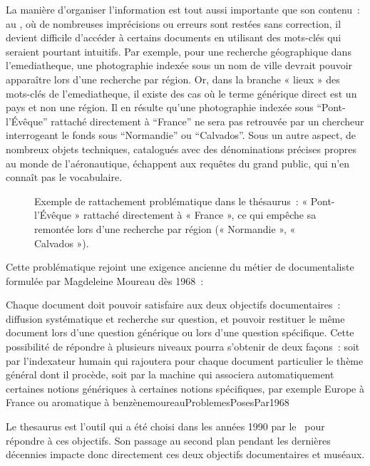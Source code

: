 La manière d’organiser l’information est tout aussi importante que son contenu~: au \mae, où de nombreuses imprécisions ou erreurs sont restées sans correction, il devient difficile d’accéder à certains documents en utilisant des mots-clés qui seraient pourtant intuitifs. Par exemple, pour une recherche géographique dans l’\gls{emediatheque}, une photographie indexée sous un nom de ville devrait pouvoir apparaître lors d’une recherche par région. Or, dans la branche « lieux » des mots-clés de l’\gls{emediatheque}, il existe des cas où le terme générique direct est un pays et non une région. Il en résulte qu’une photographie indexée sous \enquote{Pont-l’Évêque} rattaché directement à  \enquote{France} ne sera pas retrouvée par un chercheur interrogeant le fonds sous \enquote{Normandie} ou \enquote{Calvados}. Sous un autre aspect, de nombreux objets techniques, catalogués avec des dénominations précises propres au monde de l’aéronautique, échappent aux requêtes du grand public, qui n’en connaît pas le vocabulaire.

\begin{figure}[htbp]
	
	\caption{Exemple de rattachement problématique dans le thésaurus~: « Pont-l’Évêque » rattaché directement à « France », ce qui empêche sa remontée lors d'une recherche par région (« Normandie », « Calvados »).}
	\label{fig:thesaurus_geo_pb}
\end{figure}


Cette problématique rejoint une exigence ancienne du métier de documentaliste formulée par Magdeleine Moureau dès 1968~:

\begin{myquote}
	{Chaque document doit pouvoir satisfaire aux deux objectifs documentaires~: diffusion systématique et recherche sur question, et pouvoir restituer le même document lors d’une question générique ou lors d’une question spécifique. Cette possibilité de répondre à plusieurs niveaux pourra s’obtenir de deux façons~: soit par l’indexateur humain qui rajoutera pour chaque document particulier le thème général dont il procède, soit par la machine qui associera automatiquement certaines notions génériques à certaines notions spécifiques, par exemple Europe à France ou aromatique à benzène}{moureauProblemesPosesPar1968}
\end{myquote}

Le \gls{thesaurus} est l’outil qui a été choisi dans les années 1990 par le \mae~pour répondre à ces objectifs. Son passage au second plan pendant les dernières décennies impacte donc directement ces deux objectifs documentaires et muséaux.

